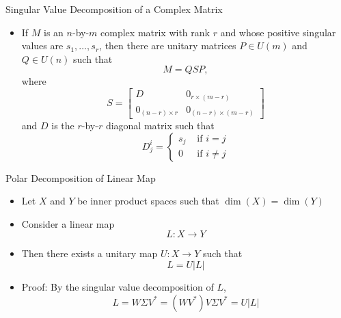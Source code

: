 \documentclass[usenames,dvipsnames,10pt]{beamer}
\begin{document}
\begin{frame}
  {Singular Value Decomposition of a Complex Matrix}

  \begin{itemize}
  \item If $M$ is an $n$-by-$m$ complex matrix with rank $r$ and whose positive singular values are $s_1, \dots, s_r$, then there are unitary matrices $P \in U(m)$ and $Q \in U(n)$  such that
    \[
      M = QSP,
    \]
    where
    \[
      S = 
      \left[\begin{array}{c|c} D & 0_{r\times (m-r)} \\ \hline 0_{(n-r)\times r} & 0_{(n-r)\times (m-r)}\end{array}\right]
    \]
    and $D$ is the $r$-by-$r$ diagonal matrix such that
    \[
      D^i_j =
      \begin{cases}
        s_j &\text{ if }i = j\\
        0 &\text{ if }i \ne j
      \end{cases}
    \]
  \end{itemize}
\end{frame}

\begin{frame}
  {Polar Decomposition of Linear Map}

  \begin{itemize}
  \item Let $X$ and $Y$ be inner product spaces such that $\dim(X) = \dim(Y)$
  \item Consider a linear map
    \[ L: X \rightarrow Y \]
  \item Then there exists a unitary map $U: X \rightarrow Y$ such that
    \[
      L = U|L|
    \]
  \item Proof: By the singular value decomposition of $L$,
    \[
      L = W\Sigma V^* = (WV^*)V\Sigma V^* = U|L|
    \]
  \end{itemize}
\end{frame}
\end{document}
